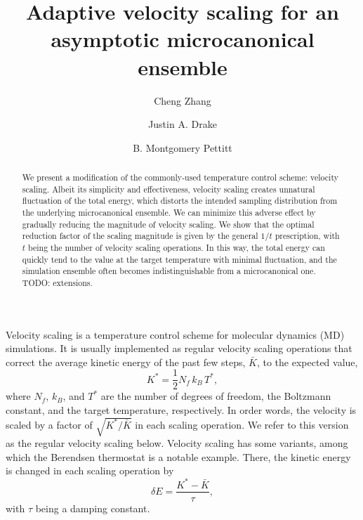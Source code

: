 \documentclass[reprint]{revtex4-1}
\begin{document}
\title{Adaptive velocity scaling for an asymptotic
microcanonical ensemble}

\author{Cheng Zhang}
\author{Justin A. Drake}
\author{B. Montgomery Pettitt}

\begin{abstract}
  We present a modification of the commonly-used
  temperature control scheme: velocity scaling.
  Albeit its simplicity and effectiveness,
  velocity scaling creates unnatural fluctuation
  of the total energy, which distorts
  the intended sampling distribution
  from the underlying microcanonical ensemble.
  We can minimize this adverse effect by
  gradually reducing the magnitude of velocity scaling.
  We show that the optimal reduction factor of the scaling magnitude
  is given by the general $1/t$ prescription,
  with $t$ being the number of velocity scaling operations.
  In this way,
  the total energy can quickly tend to the value
  at the target temperature
  with minimal fluctuation,
  and the simulation ensemble often becomes
  indistinguishable from a microcanonical one.
  TODO: extensions. 
\end{abstract}

\maketitle



Velocity scaling is a temperature control scheme
for molecular dynamics (MD) simulations.
%
It is usually implemented as
regular velocity scaling operations
that correct the average
kinetic energy of the past few steps, $\bar K$,
to the expected value\cite{frenkel, haile},
%
\begin{equation}
  K^* = \frac{1}{2} N_f \, k_B \, T^*
  ,
  \label{eq:K_canon}
\end{equation}
%
where $N_f$, $k_B$, and $T^*$ are the number of degrees of freedom,
the Boltzmann constant, and the target temperature, respectively.
%
In order words,
the velocity is scaled by a factor of
$\sqrt{ K^* / \bar K }$
in each scaling operation.
%
We refer to this version as the regular velocity scaling below.
%
Velocity scaling has some variants,
among which
the Berendsen thermostat\cite{berendsen1984}
is a notable example.
%
There,
the kinetic energy is changed in each scaling operation
by
%
\begin{equation}
  \delta E = \frac{ K^* - \bar K } { \tau },
  \label{eq:Berendsen}
\end{equation}
%
with $\tau$ being a damping constant.
\end{document}

